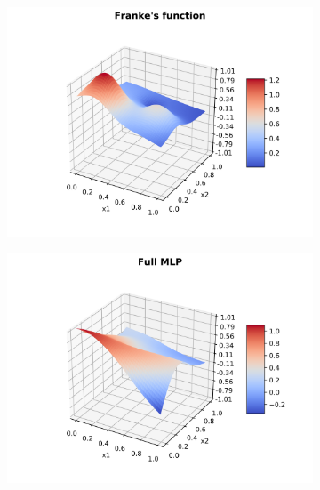 \documentclass[a4paper]{article}
\numberwithin{equation}{section} %
\numberwithin{figure}{section} %
\numberwithin{table}{section} %
\theoremstyle{definition}
\begin{document}
\begin{figure}[H]
	\centering
	\begin{subfigure}{.32\textwidth}
		\centering
		\includegraphics[width=1.0\linewidth]{images/franke.png}
	\end{subfigure}
	\begin{subfigure}{.32\textwidth}
		\centering
		\includegraphics[width=1.0\linewidth]{images/MLP_N_50_sigma_4_rho_1e-05.png}
	\end{subfigure}
	\begin{subfigure}{.32\textwidth}
		\centering

\end{subfigure}
\end{figure}
\end{document}
